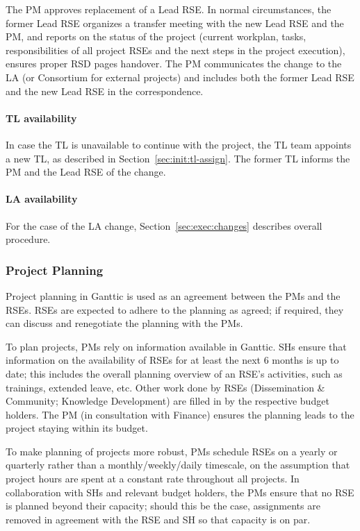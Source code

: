 The PM approves replacement of a Lead RSE. In normal circumstances, the former Lead RSE organizes a transfer meeting
with the new Lead RSE and the PM, and reports on the status of the project (current workplan, tasks, responsibilities
of all project RSEs and the next steps in the project execution), ensures proper RSD pages handover. The PM
communicates the change to the LA (or Consortium for external projects) and includes both the former Lead RSE and the
new Lead RSE in the correspondence.

\paragraph{TL availability} In case the TL is unavailable to continue with the project, the TL team appoints a new TL, as described in Section~\ref{sec:init:tl-assign}.
The former TL informs the PM and the Lead RSE of the change.

\paragraph{LA availability} For the case of the LA change, Section~\ref{sec:exec:changes} describes overall procedure.

\subsubsection{Project Planning}

Project planning in Ganttic is used as an agreement between the PMs and the RSEs. RSEs are expected to adhere to the
planning as agreed; if required, they can discuss and renegotiate the planning with the PMs.

To plan projects, PMs rely on information available in Ganttic. SHs ensure that information on the availability of RSEs
for at least the next 6 months is up to date; this includes the overall planning overview of an
RSE's activities, such as trainings, extended leave, etc. Other work done by RSEs (Dissemination
\& Community; Knowledge Development) are filled in by the respective budget holders. The PM (in consultation with Finance)
ensures the planning leads to the project staying within its budget.

To make planning of projects more robust, PMs schedule RSEs on a yearly or quarterly rather than a monthly/weekly/daily
timescale, on the assumption that project hours are spent at a constant rate throughout all projects. In collaboration
with SHs and relevant budget holders, the PMs ensure that no RSE is planned beyond their capacity; should this be the
case, assignments are removed in agreement with the RSE and SH so that capacity is on par.

